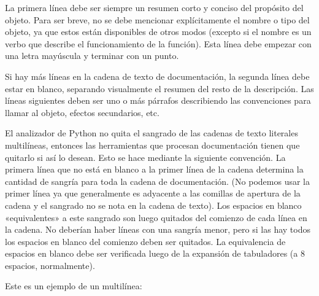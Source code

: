 \documentclass[a5paper,10pt,spanish]{sphinxmanual}
\begin{document}
\sphinxAtStartPar
La primera línea debe ser siempre un resumen corto y conciso del propósito del objeto. Para ser breve, no se debe mencionar explícitamente el nombre o tipo del objeto, ya que estos están disponibles de otros modos (excepto si el nombre es un verbo que describe el funcionamiento de la función). Esta línea debe empezar con una letra mayúscula y terminar con un punto.

\sphinxAtStartPar
Si hay más líneas en la cadena de texto de documentación, la segunda línea debe estar en blanco, separando visualmente el resumen del resto de la descripción. Las líneas siguientes deben ser uno o más párrafos describiendo las convenciones para llamar al objeto, efectos secundarios, etc.

\sphinxAtStartPar
El analizador de Python no quita el sangrado de las cadenas de texto literales multi\sphinxhyphen{}líneas, entonces las herramientas que procesan documentación tienen que quitarlo si así lo desean. Esto se hace mediante la siguiente convención. La primera línea que no está en blanco  a la primer línea de la cadena determina la cantidad de sangría para toda la cadena de documentación. (No podemos usar la primer línea ya que generalmente es adyacente a las comillas de apertura de la cadena y el sangrado no se nota en la cadena de texto). Los espacios en blanco «equivalentes» a este sangrado son luego quitados del comienzo de cada línea en la cadena. No deberían haber líneas con una sangría menor, pero si las hay todos los espacios en blanco del comienzo deben ser quitados. La equivalencia de espacios en blanco debe ser verificada luego de la expansión de tabuladores (a 8 espacios, normalmente).

\sphinxAtStartPar
Este es un ejemplo de un  multi\sphinxhyphen{}línea:

\begin{sphinxVerbatim}[commandchars=\\\{\}]
 
    
    

\end{sphinxVerbatim}
\end{document}
